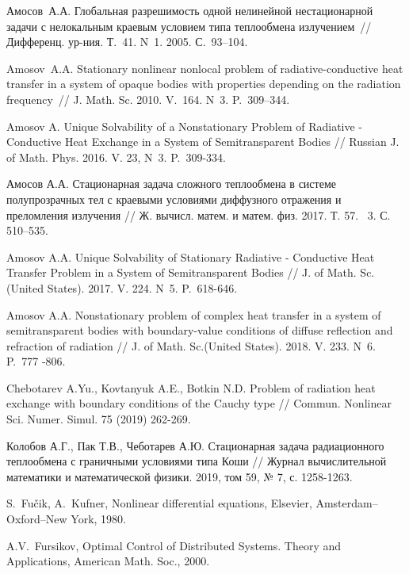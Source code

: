 \documentclass[12pt]{article}
\begin{document}
\begin{thebibliography}{999}
        Амосов~А.А. Глобальная разрешимость одной нелинейной
        нестационарной задачи с нелокальным краевым условием типа
        теплообмена излучением~// Дифференц.
        ур-ния. Т.~41. N~1. 2005. С.~93--104.

        Amosov~A.A. Stationary nonlinear nonlocal problem of
        radiative-conductive heat transfer in a system of opaque bodies
        with properties depending on the radiation frequency~// J.
        Math. Sc. 2010. V.~164. N~3. P.~309--344.

        Amosov A. Unique Solvability of a Nonstationary Problem of Radiative - Conductive
        Heat Exchange in a System of Semitransparent Bodies // Russian J. of Math.
        Phys. 2016. V. 23, N~3. P.~309-334.

        Амосов А.А. Стационарная задача сложного теплообмена в системе полупрозрачных тел с краевыми условиями
        диффузного отражения и преломления излучения // Ж.
        вычисл. матем. и матем. физ. 2017. Т. 57. \textnumero~3. С. 510--535.

        Amosov A.A. Unique Solvability of Stationary Radiative - Conductive Heat Transfer
        Problem in a System of Semitransparent Bodies // J. of Math.
        Sc.(United States). 2017. V. 224. N~5. P.~618-646.

        Amosov A.A. Nonstationary problem of complex heat transfer in a system of
        semitransparent bodies with boundary-value conditions of diffuse reflection and refraction
        of radiation // J. of Math. Sc.(United States). 2018. V. 233. N~6. P.~777 -806.

        Chebotarev A.Yu., Kovtanyuk A.E., Botkin N.D. Problem of radiation heat exchange with boundary conditions
        of the Cauchy type // Commun.
        Nonlinear Sci. Numer. Simul. 75 (2019) 262-269.

        Колобов А.Г., Пак Т.В., Чеботарев А.Ю. Стационарная задача радиационного теплообмена с граничными условиями
        типа Коши // Журнал вычислительной математики и математической физики.
        2019, том 59, № 7, с. 1258-1263.


         S.~Fu\v{c}ik, A.~Kufner, Nonlinear differential equations,
        Elsevier, Amsterdam--Oxford--New York, 1980.

         A.V.~Fursikov, Optimal Control of Distributed
        Systems. Theory and Applications, American Math. Soc., 2000.


\end{thebibliography}
\end{document}

